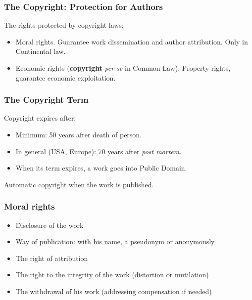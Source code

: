 \begin{frame}
\frametitle{The Copyright: Protection for Authors}

The rights protected by copyright laws:
\begin{itemize}
\item \alert{Moral rights}. Guarantee work dissemination and author attribution.
Only in Continental law.
\item \alert{Economic rights} (\textbf{copyright} \textit{per se} in Common Law). Property rights, guarantee economic exploitation.
\end{itemize}


\end{frame}


\begin{frame}
\frametitle{The Copyright Term}

Copyright expires after:

\begin{itemize}
\item Minimum: 50 years after death of person. 
\item In general (USA, Europe): 70 years after \textit{post mortem}.
\item When its term expires, a work goes into Public Domain.
\end{itemize}
\pause
\begin{center}
Automatic copyright when the work is published.
\end{center}

\end{frame}



\begin{frame}
\frametitle{Moral rights}

\begin{itemize}
\item Disclosure of the work
\item Way of publication: with his name, a pseudonym or anonymously
\item The right of attribution
\item The right to the integrity of the work (distortion or mutilation)
\item The withdrawal of his work (addressing compensation if needed)
\end{itemize}

\end{frame}

